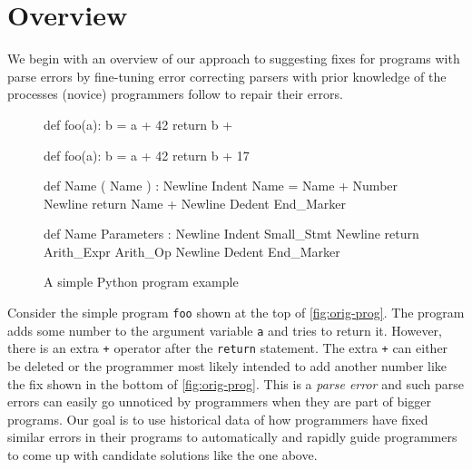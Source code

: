 \section{Overview}
\label{sec:overview}

We begin with an overview of our approach to suggesting fixes for programs with
parse errors by fine-tuning error correcting parsers with prior knowledge of the
processes (novice) programmers follow to repair their errors.

\begin{figure}[h]
\centering
\begin{minipage}[c]{0.38\linewidth}
\begin{ecode}
def foo(a):
  b = a + 42
  return b +
\end{ecode}

\begin{ecode}
def foo(a):
  b = a + 42
  return b + 17
\end{ecode}
\label{fig:orig-prog}
\end{minipage}%
\hspace{0.02\linewidth}%
\begin{minipage}[c]{0.58\linewidth}
\begin{ecode}
def Name ( Name ) : Newline
Indent Name = Name + Number Newline
return Name + Newline
Dedent End_Marker
\end{ecode}

\begin{ecode}
def Name Parameters : Newline
Indent Small_Stmt Newline
return Arith_Expr Arith_Op Newline
Dedent End_Marker
\end{ecode}
\label{fig:abstract-prog}
\end{minipage}
\caption{A simple Python program example}
\end{figure}


 Consider the simple program \texttt{foo} shown at the top
of \autoref{fig:orig-prog}. The program adds some number to the argument
variable \texttt{a} and tries to return it. However, there is an extra
\texttt{+} operator after the \texttt{return} statement. The extra \texttt{+}
can either be deleted or the programmer most likely intended to add another
number like the fix shown in the bottom of \autoref{fig:orig-prog}. This is a
\emph{parse error} and such parse errors can easily go unnoticed
\citep{Denny_2012, Ahadi_2018, VanDerSpek_2005} by programmers when they are
part of bigger programs.
%
Our goal is to use historical data of how programmers have fixed similar errors
in their programs to automatically and rapidly guide programmers to come up with
candidate solutions like the one above.


